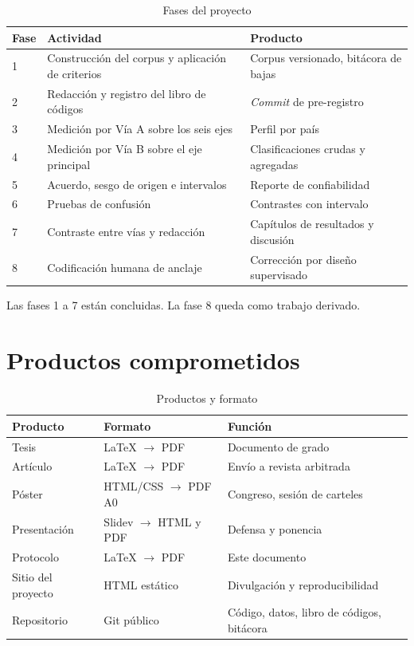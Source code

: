 \documentclass[12pt,letterpaper]{article}
\begin{document}
\begin{table}[htbp]
\centering
\small
\caption{Fases del proyecto}
\begin{tabular}{@{}p{1.4cm}p{7.5cm}p{4.5cm}@{}}
\toprule
\textbf{Fase} & \textbf{Actividad} & \textbf{Producto} \\
\midrule
1 & Construcción del corpus y aplicación de criterios & Corpus versionado, bitácora de bajas \\
2 & Redacción y registro del libro de códigos & \textit{Commit} de pre-registro \\
3 & Medición por Vía A sobre los seis ejes & Perfil por país \\
4 & Medición por Vía B sobre el eje principal & Clasificaciones crudas y agregadas \\
5 & Acuerdo, sesgo de origen e intervalos & Reporte de confiabilidad \\
6 & Pruebas de confusión & Contrastes con intervalo \\
7 & Contraste entre vías y redacción & Capítulos de resultados y discusión \\
8 & Codificación humana de anclaje & Corrección por diseño supervisado \\
\bottomrule
\end{tabular}
\end{table}

Las fases 1 a 7 están concluidas. La fase 8 queda como trabajo derivado.


\section{Productos comprometidos}

\begin{table}[htbp]
\centering
\small
\caption{Productos y formato}
\begin{tabular}{@{}p{3.6cm}p{4.2cm}p{5.6cm}@{}}
\toprule
\textbf{Producto} & \textbf{Formato} & \textbf{Función} \\
\midrule
Tesis & \LaTeX{} $\rightarrow$ PDF & Documento de grado \\
Artículo & \LaTeX{} $\rightarrow$ PDF & Envío a revista arbitrada \\
Póster & HTML/CSS $\rightarrow$ PDF A0 & Congreso, sesión de carteles \\
Presentación & Slidev $\rightarrow$ HTML y PDF & Defensa y ponencia \\
Protocolo & \LaTeX{} $\rightarrow$ PDF & Este documento \\
Sitio del proyecto & HTML estático & Divulgación y reproducibilidad \\
Repositorio & Git público & Código, datos, libro de códigos, bitácora \\
\bottomrule
\end{tabular}
\end{table}



\end{document}
